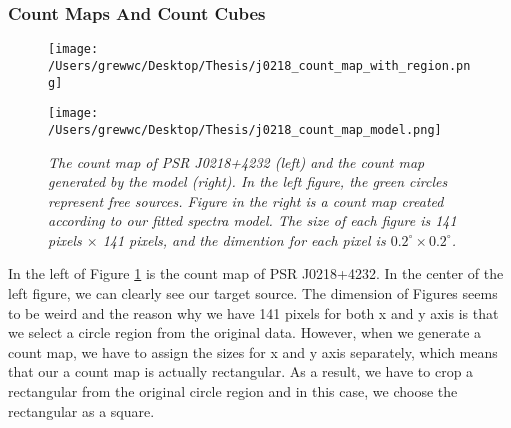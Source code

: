\documentclass[12pt]{report}
\newcommand{\mycaption}[1]{\caption{\textit{\footnotesize #1}}}
\begin{document}
          \subsubsection{Count Maps And Count Cubes}
            \begin{figure}[!ht]  
              \begin{center}
              \begin{minipage}{0.45\textwidth}
                \begin{center} 
                    \texttt{[image: /Users/grewwc/Desktop/Thesis/j0218\_count\_map\_with\_region.png]}
                \end{center}
              \end{minipage}
              \begin{minipage}{0.45\textwidth}
                \begin{center} 
                    \texttt{[image: /Users/grewwc/Desktop/Thesis/j0218\_count\_map\_model.png]}
                \end{center}
              \end{minipage}
            \end{center}
            \begin{center}
              \mycaption{The count map of PSR J0218+4232 (left) and the count map generated by the model (right). 
              In the left figure,
              the green circles represent free sources. Figure in the right is a count map created 
              according to our fitted spectra model. 
              The size of each figure is 141 pixels $\times$ 141 pixels, and the dimention for 
              each pixel is $0.2^\circ \times 0.2^\circ$.}
            \label{fig: j0218_count_map_and_model}    
            \end{center} 
          \end{figure}
          In the left of Figure \ref{fig: j0218_count_map_and_model} 
          is the count map of PSR J0218+4232.
          In the center of the left figure, 
          we can clearly see our target source. The dimension of Figures seems to be weird and 
          the reason why we have 141 pixels for both x and y axis is that we select a circle region from 
          the original data. However, when we generate a count map, we have to assign the sizes for x and y 
          axis separately, which means that our a count map is actually rectangular. As a result, we have to crop a 
          rectangular from the original circle region and in this case, we choose the rectangular as a square.  
          
\end{document}
